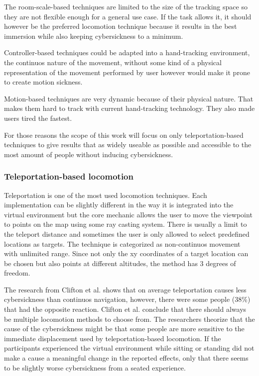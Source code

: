 The room-scale-based techniques are limited to the size of the tracking
space so they are not flexible enough for a general use case. If the
task allows it, it should however be the preferred locomotion technique
because it results in the best immersion while also keeping
cybersickness to a minimum.

Controller-based techniques could be adapted into a hand-tracking
environment, the continuos nature of the movement, without some kind of
a physical representation of the movement performed by user however
would make it prone to create motion sickness.

Motion-based techniques are very dynamic because of their physical
nature. That makes them hard to track with current hand-tracking
technology. They also made users tired the fastest.

For those reasons the scope of this work will focus on only
teleportation-based techniques to give results that as widely useable as
possible and accessible to the most amount of people without inducing
cybersickness.

\subsubsection{Teleportation-based locomotion}\label{teleportation-based-locomotion}

Teleportation is one of the most used locomotion techniques. Each
implementation can be slightly different in the way it is integrated
into the virtual environment but the core mechanic allows the user to
move the viewpoint to points on the map using some ray casting system.
There is usually a limit to the teleport distance and sometimes the user
is only allowed to select predefined locations as targets. The technique
is categorized as non-continuos movement with unlimited range. Since not
only the xy coordinates of a target location can be chosen but also
points at different altitudes, the method has 3 degrees of freedom.

The research from Clifton et al. \cite{Clifton} shows that on average teleportation
causes less cybersickness than continuos navigation, however, there were
some people (38\%) that had the opposite reaction.
Clifton et al. conclude that there should always be multiple locomotion
methods to choose from. The researchers theorize that the cause of the
cybersickness might be that some people are more sensitive to the
immediate displacement used by teleportation-based locomotion. If the
participants experienced the virtual environment while sitting or
standing did not make a cause a meaningful change in the reported
effects, only that there seems to be slightly worse cybersickness from a
seated experience. 


